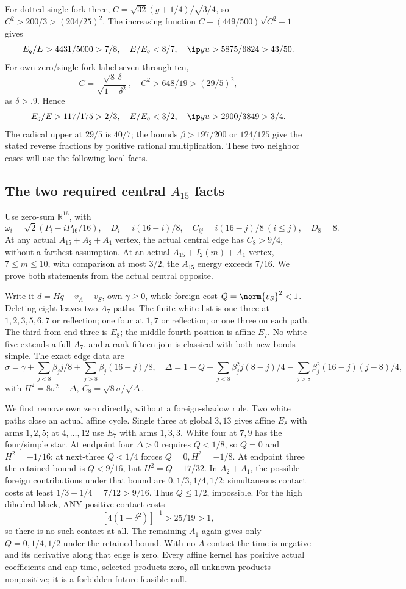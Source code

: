For dotted single-fork-three,
\(C=\sqrt{32}(g+1/4)/\sqrt{3/4}\), so
\(C^2>200/3>(204/25)^2\).
The increasing function \(C-(449/500)\sqrt{C^2-1}\) gives
\[
 E_q/E>4431/5000>7/8,\quad E/E_q<8/7,\quad
 \ip yu>5875/6824>43/50 .
\]
For own-zero/single-fork label seven through ten,
\[
 C=\frac{\sqrt8\,\delta}{\sqrt{1-\delta^2}},\quad
 C^2>648/19>(29/5)^2 ,
\]
as \(\delta>.9\). Hence
\[
 E_q/E>117/175>2/3,\quad E/E_q<3/2,\quad
 \ip yu>2900/3849>3/4 .
\]
The radical upper at \(29/5\) is \(40/7\);
the bounds \(\beta>197/200\) or \(124/125\) give the stated
reverse fractions by positive rational multiplication.
These two neighbor cases will use the following local facts.

\subsection{The two required central \(A_{15}\) facts}
\label{app:D18localA15}
Use zero-sum \(\mathbb R^{16}\), with
\[
 \omega_i=\sqrt2(P_i-iP_{16}/16),\quad
 D_i=i(16-i)/8,\quad C_{ij}=i(16-j)/8\ (i\leq j),\quad D_8=8 .
\]
At any actual \(A_{15}+A_2+A_1\) vertex, the actual central
edge has \(C_8>9/4\), without a farthest assumption.
At an actual \(A_{15}+I_2(m)+A_1\) vertex, \(7\leq m\leq10\),
with comparison at most \(3/2\), the \(A_{15}\) energy exceeds
\(7/16\). We prove both statements from the actual central opposite.

Write it \(d=Hq-v_A-v_S\), own \(\gamma\geq0\),
whole foreign cost \(Q=\norm{v_S}^2<1\).
Deleting eight leaves two \(A_7\) paths.
The finite white list is one three at
\(1,2,3,5,6,7\) or reflection; one four at \(1,7\)
or reflection; or one three on each path.
The third-from-end three is \(E_8\); the middle fourth position
is affine \(E_7\). No white five extends a full \(A_7\), and
a rank-fifteen join is classical with both new bonds simple.
The exact edge data are
\[
 \sigma=\gamma+
 \sum_{j<8}\beta_jj/8+\sum_{j>8}\beta_j(16-j)/8,\quad
 \Delta=1-Q-\sum_{j<8}\beta_j^2j(8-j)/4
             -\sum_{j>8}\beta_j^2(16-j)(j-8)/4 ,
\]
with \(H^2=8\sigma^2-\Delta,\ C_8=\sqrt8\sigma/\sqrt\Delta\).

We first remove own zero directly, without a foreign-shadow rule.
Two white paths close an actual affine cycle.
Single three at global \(3,13\) gives affine \(E_8\)
with arms \(1,2,5\); at \(4,\ldots,12\) use \(E_7\)
with arms \(1,3,3\).
White four at \(7,9\) has the four/simple star.
At endpoint four \(\Delta>0\) requires \(Q<1/8\),
so \(Q=0\) and \(H^2=-1/16\);
at next-three \(Q<1/4\) forces \(Q=0,H^2=-1/8\).
At endpoint three the retained bound is \(Q<9/16\),
but \(H^2=Q-17/32\).
In \(A_2+A_1\), the possible foreign contributions under that
bound are \(0,1/3,1/4,1/2\); simultaneous contact costs
at least \(1/3+1/4=7/12>9/16\).
Thus \(Q\leq1/2\), impossible.
For the high dihedral block, ANY positive contact costs
\[
 [4(1-\delta^2)]^{-1}>25/19>1 ,
\]
so there is no such contact at all. The remaining \(A_1\)
again gives only \(Q=0,1/4,1/2\) under the retained bound.
With no \(A\) contact the time is negative and its derivative
along that edge is zero.
Every affine kernel has positive actual coefficients and cap time,
selected products zero, all unknown products nonpositive;
it is a forbidden future feasible null.

